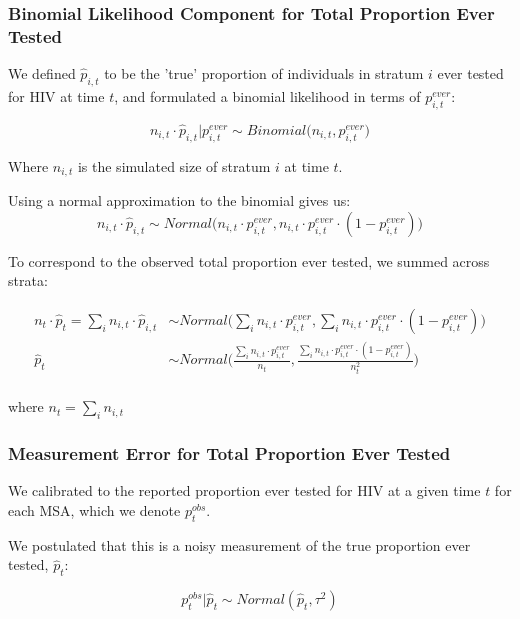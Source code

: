 \documentclass{article}
\begin{document}
\subsubsection{Binomial Likelihood Component for Total Proportion Ever Tested}

We defined $\hat{p}_{i,t}$ to be the 'true' proportion of individuals in stratum $i$ ever tested for HIV at time $t$, and formulated a binomial likelihood in terms of $p^{ever}_{i,t}$:

\begin{equation}
	n_{i,t} \cdot \hat{p}_{i,t} | p^{ever}_{i,t} \sim Binomial\big(n_{i,t}, p^{ever}_{i,t}\big)
\end{equation}

Where $n_{i,t}$ is the simulated size of stratum $i$ at time $t$.

Using a normal approximation to the binomial gives us:
\begin{equation}
	n_{i,t} \cdot \hat{p}_{i,t} \sim Normal\big(n_{i,t} \cdot p^{ever}_{i,t}, n_{i,t} \cdot p^{ever}_{i,t} \cdot(1-p^{ever}_{i,t} )\big)
\end{equation}

To correspond to the observed total proportion ever tested, we summed across strata:

\begin{align}
	n_t \cdot \hat{p}_t = \sum_i n_{i,t} \cdot \hat{p}_{i,t} &\sim Normal \Big(\sum_i n_{i,t} \cdot p^{ever}_{i,t}, \sum_i n_{i,t} \cdot p^{ever}_{i,t} \cdot(1-p^{ever}_{i,t}) \Big) \\
	\hat{p}_t &\sim Normal \Bigg(\frac{\sum_i n_{i,t} \cdot p^{ever}_{i,t}}{n_t}, \frac{\sum_i n_{i,t} \cdot p^{ever}_{i,t} \cdot(1-p^{ever}_{i,t})}{n_t^2} \Bigg) \\
\end{align}

where $n_t = \sum_i n_{i,t}$

\subsubsection{Measurement Error for Total Proportion Ever Tested}

We calibrated to the reported proportion ever tested for HIV at a given time $t$ for each MSA, which we denote $p^{obs}_t$.

We postulated that this is a noisy measurement of the true proportion ever tested, $\hat{p}_t$:

\begin{equation}
	p^{obs}_t | \hat{p}_t \sim Normal(\hat{p}_t, \tau^2)
\end{equation}
\end{document}
